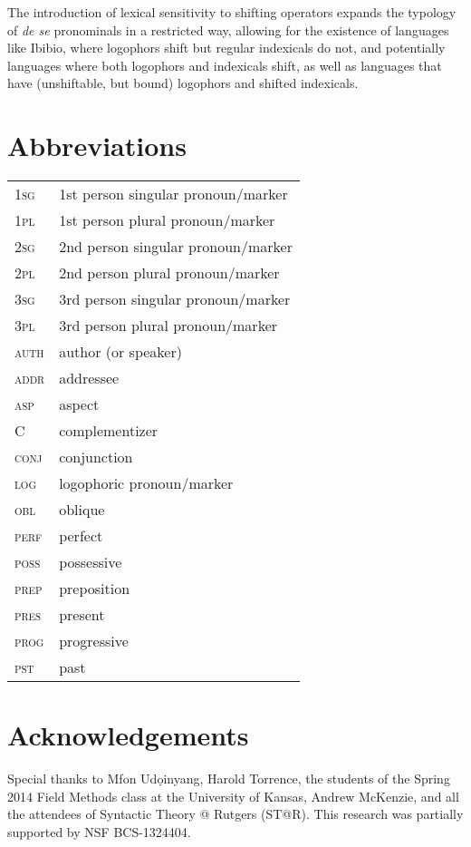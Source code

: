 \documentclass[output=paper]{langscibook}
\begin{document}
The introduction of lexical sensitivity to shifting operators expands the typology of \textit{de se} pronominals in a restricted way, allowing for the existence of languages like Ibibio, where logophors shift but regular indexicals do not, and potentially languages where both logophors and indexicals shift, as well as languages that have (unshiftable, but bound) logophors and shifted indexicals.


\section*{Abbreviations} 
\noindent\begin{tabularx}{.8\textwidth}{@{}>{\scshape}lQ@{}}
\textsc{1sg} & 1st person singular pronoun/marker\\
\textsc{1pl} & 1st person plural pronoun/marker\\
\textsc{2sg} & 2nd person singular pronoun/marker\\
\textsc{2pl} & 2nd person plural pronoun/marker\\
\textsc{3sg} & 3rd person singular pronoun/marker\\
\textsc{3pl} & 3rd person plural pronoun/marker\\
\textsc{auth} & author (or speaker)\\
\textsc{addr} & addressee\\
\textsc{asp} & aspect\\
C & complementizer\\
\textsc{conj} & conjunction\\
\textsc{log} & logophoric pronoun/marker\\
\textsc{obl} & oblique\\
\textsc{perf} & perfect\\
\textsc{poss} & possessive\\
\textsc{prep} & preposition\\
\textsc{pres} & present\\
\textsc{prog} & progressive\\
\textsc{pst} & past\\
\end{tabularx}

\section*{Acknowledgements}
Special thanks to Mfon Ud\d{o}inyang, Harold Torrence, the students of the Spring 2014 Field Methods class at the University of Kansas, Andrew McKenzie, and all the attendees of Syntactic Theory @ Rutgers (ST@R). This research was partially supported by NSF BCS-1324404.

{\sloppy \printbibliography[heading=subbibliography,notkeyword=this]}
\end{document}
